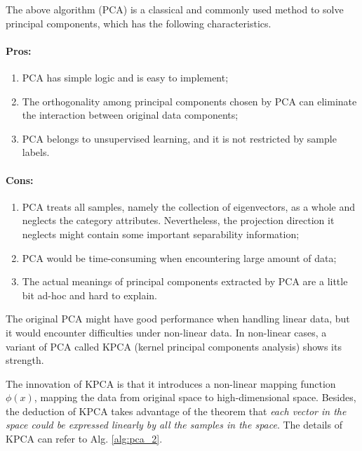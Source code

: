 \documentclass[12pt,a4paper]{article}
\theoremstyle{definition}
\begin{document}
The above algorithm (PCA) is a classical and commonly used method to solve principal components, which has the following characteristics.

\vspace{-0.012\linewidth}
\paragraph{Pros:}
\begin{enumerate}
	\item PCA has simple logic and is easy to implement;
	
	\item The orthogonality among principal components chosen by PCA can eliminate the interaction between original data components;
	
	\item PCA belongs to unsupervised learning, and it is not restricted by sample labels.
\end{enumerate}

\vspace{-0.03\linewidth}
\paragraph{Cons:}
\begin{enumerate}
	\item PCA treats all samples, namely the collection of eigenvectors, as a whole and neglects the category attributes. Nevertheless, the projection direction it neglects might contain some important separability information;
	
	\item PCA would be time-consuming when encountering large amount of data;
	
	\item The actual meanings of principal components extracted by PCA are a little bit ad-hoc and hard to explain.
\end{enumerate}

The original PCA might have good performance when handling linear data, but it would encounter difficulties under non-linear data. In non-linear cases, a variant of PCA called KPCA (kernel principal components analysis) shows its strength.

The innovation of KPCA is that it introduces a non-linear mapping function $\phi(x)$, mapping the data from original space to high-dimensional space. Besides, the deduction of KPCA takes advantage of the theorem that \textit{each vector in the space could be expressed linearly by all the samples in the space}. The details of KPCA can refer to Alg. \ref{alg:pca_2}.
\end{document}
